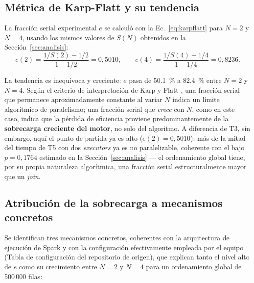 \documentclass[10pt,conference]{IEEEtran}
\begin{document}
\subsection{Métrica de Karp-Flatt y su tendencia}

La fracción serial experimental $e$ se calculó con la Ec.~\eqref{eq:karpflatt} para $N=2$ y $N=4$, usando los mismos valores de $S(N)$ obtenidos en la Sección~\ref{sec:analisis}:
\[
e(2) = \frac{1/S(2) - 1/2}{1 - 1/2} = 0{,}5010, \qquad
e(4) = \frac{1/S(4) - 1/4}{1 - 1/4} = 0{,}8236.
\]

La tendencia es inequívoca y creciente: $e$ pasa de \SI{50.1}{\percent} a \SI{82.4}{\percent} entre $N=2$ y $N=4$. Según el criterio de interpretación de Karp y Flatt \cite{karpflatt1990}, una fracción serial que permanece aproximadamente constante al variar $N$ indica un límite algorítmico de paralelismo; una fracción serial que \emph{crece} con $N$, como en este caso, indica que la pérdida de eficiencia proviene predominantemente de la \textbf{sobrecarga creciente del motor}, no solo del algoritmo. A diferencia de T3, sin embargo, aquí el punto de partida ya es alto ($e(2)=0{,}5010$): más de la mitad del tiempo de T5 con dos \textit{executors} ya es no paralelizable, coherente con el bajo $p=0{,}1764$ estimado en la Sección~\ref{sec:analisis} --- el ordenamiento global tiene, por su propia naturaleza algorítmica, una fracción serial estructuralmente mayor que un \textit{join}.

\subsection{Atribución de la sobrecarga a mecanismos concretos}

Se identifican tres mecanismos concretos, coherentes con la arquitectura de ejecución de Spark \cite{zaharia2012rdd,zaharia2016spark} y con la configuración efectivamente empleada por el equipo (Tabla de configuración del repositorio de origen), que explican tanto el nivel alto de $e$ como su crecimiento entre $N=2$ y $N=4$ para un ordenamiento global de 500\,000 filas:
\end{document}
